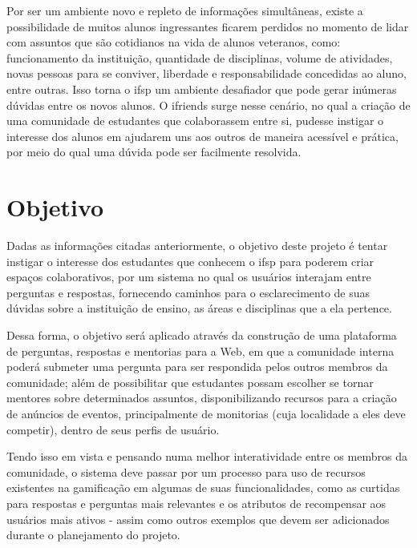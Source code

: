 Por ser um ambiente novo e repleto de informações simultâneas, existe a possibilidade de muitos alunos ingressantes ficarem perdidos no momento de lidar com assuntos que são cotidianos na vida de alunos veteranos, como: funcionamento da instituição, quantidade de disciplinas, volume de atividades, novas pessoas para se conviver, liberdade e responsabilidade concedidas ao aluno, entre outras. Isso torna o \acs{ifsp} um ambiente desafiador que pode gerar inúmeras dúvidas entre os novos alunos. 
O \gls{ifriends} surge nesse cenário, no qual a criação de uma comunidade de estudantes que colaborassem entre si, pudesse instigar o interesse dos alunos em ajudarem uns aos outros de maneira acessível e prática, por meio do qual uma dúvida pode ser facilmente resolvida.

\section{Objetivo}

Dadas as informações citadas anteriormente, o objetivo deste projeto é tentar instigar o interesse dos estudantes que conhecem o \acs{ifsp} para poderem criar espaços colaborativos, por um sistema no qual os usuários interajam entre perguntas e respostas, fornecendo caminhos para o esclarecimento de suas dúvidas sobre a instituição de ensino, as áreas e disciplinas que a ela pertence.  

Dessa forma, o objetivo será aplicado através da construção de uma plataforma de perguntas, respostas e mentorias para a Web, em que a comunidade interna poderá submeter uma pergunta para ser respondida pelos outros membros da comunidade; além de possibilitar que estudantes possam escolher se tornar mentores sobre determinados assuntos, disponibilizando recursos para a criação de anúncios de eventos, principalmente de monitorias (cuja localidade a eles deve competir), dentro de seus perfis de usuário. 

Tendo isso em vista e pensando numa melhor interatividade entre os membros da comunidade, o sistema deve passar por um processo para uso de recursos existentes na \gls{gamificação} em algumas de suas funcionalidades, como as curtidas para respostas e perguntas mais relevantes e os atributos de recompensar aos usuários mais ativos  - assim como outros exemplos que devem ser adicionados durante o planejamento do projeto.

